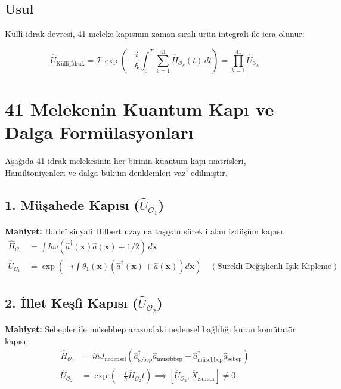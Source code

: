 \documentclass[11pt, a4paper]{article}
\begin{document}
\subsection{Usul}
Küllî idrak devresi, 41 meleke kapısının zaman-sıralı ürün integrali ile icra olunur:

\begin{equation}
\hat{U}_{\text{Küllî\_İdrak}} = \mathcal{T} \exp\left( -\frac{i}{\hbar} \int_0^T \sum_{k=1}^{41} \hat{H}_{\mathcal{O}_k}(t) \, dt \right) = \prod_{k=1}^{41} \hat{U}_{\mathcal{O}_k}
\end{equation}

\section{41 Melekenin Kuantum Kapı ve Dalga Formülasyonları}

Aşağıda 41 idrak melekesinin her birinin kuantum kapı matrisleri, Hamiltoniyenleri ve dalga büküm denklemleri vaz' edilmiştir.

\subsection{1. Müşahede Kapısı ($\hat{U}_{\mathcal{O}_1}$)}
\textbf{Mahiyet:} Haricî sinyali Hilbert uzayına taşıyan sürekli alan izdüşüm kapısı.
\begin{align}
\hat{H}_{\mathcal{O}_1} &= \int \hbar \omega (\hat{a}^\dagger(\mathbf{x}) \hat{a}(\mathbf{x}) + 1/2) \, d\mathbf{x} \\
\hat{U}_{\mathcal{O}_1} &= \exp\left( -i \int \theta_1(\mathbf{x}) (\hat{a}^\dagger(\mathbf{x}) + \hat{a}(\mathbf{x})) d\mathbf{x} \right) \quad (\text{Sürekli Değişkenli Işık Kipleme})
\end{align}

\subsection{2. İllet Keşfi Kapısı ($\hat{U}_{\mathcal{O}_2}$)}
\textbf{Mahiyet:} Sebepler ile müsebbep arasındaki nedensel bağlılığı kuran komütatör kapısı.
\begin{align}
\hat{H}_{\mathcal{O}_2} &= i \hbar J_{\text{nedensel}} \left( \hat{a}_{\text{sebep}}^\dagger \hat{a}_{\text{müsebbep}} - \hat{a}_{\text{müsebbep}}^\dagger \hat{a}_{\text{sebep}} \right) \\
\hat{U}_{\mathcal{O}_2} &= \exp\left( -\frac{i}{\hbar} \hat{H}_{\mathcal{O}_2} t \right) \implies [\hat{U}_{\mathcal{O}_2}, \hat{X}_{\text{zaman}}] \neq 0
\end{align}
\end{document}
